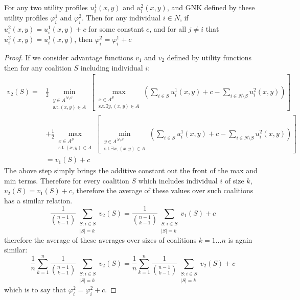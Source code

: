 \begin{theorem}\DIFaddbegin \label{thm:appendix_shift_invariant}
\DIFaddend For any two utility profiles $u^1_i(x,y)$ and $u^2_i(x,y)$, and GNK defined by these utility profiles $\varphi_i^1$ and $\varphi_i^2$.
Then for any individual $i\in N$, if $u_i^2(x,y) = u_i^1(x,y)+c$ for some constant $c$, and for all $j\neq i$ that $u^2_i(x,y) = u^1_i(x,y)$, then $\varphi_i^2 = \varphi_i^1+c$ 
\end{theorem}
\begin{proof}
If we consider advantage functions $v_1$ and $v_2$ defined by utility functions \DIFdelbegin {}\DIFdelend \DIFaddbegin {}\DIFaddend then for any coalition $S$ including individual $i$:
\begin{align}
v_2(S) = &
\frac{1}{2}\min_{\substack{y\in A^{N\setminus S} \\ \text{s.t.}(x,y)\in A}} \left[
\max_{\substack{x\in A^S \\ \text{s.t.}\exists y,(x,y)\in A}}
	\left(\sum_{i\in S} u^1_i(x,y)+c - \sum_{i\in N\setminus S}u_i^2(x,y)\right)\right]\nonumber\\
& +
\frac{1}{2}\max_{\substack{x\in A^S \\ \text{s.t.}(x,y)\in A}} \left[
\min_{\substack{y\in A^{N\setminus S} \\ \text{s.t.}\exists x,(x,y)\in A}}
	\left(\sum_{i\in S} u^1_i(x,y)+c - \sum_{i\in N\setminus S} u_i^2(x,y) \right) \right]\nonumber\\
&= v_1(S)+c\nonumber
\end{align}
The above step simply brings the additive constant out the front of the max and min terms.
Therefore for every coalition $S$ which includes individual $i$ of size $k$, $v_2(S)=v_1(S)+c$, therefore the average of these values over such coalitions has a similar relation.
$$\frac{1}{\binom{n-1}{k-1}} \sum_{\substack{S:i\in S \\ |S|=k}}v_2(S) = \frac{1}{\binom{n-1}{k-1}} \sum_{\substack{S:i\in S \\ |S|=k}}v_1(S) + c$$
therefore the average of these averages over sizes of coalitions $k=1\dots n$ is again similar:
$$\frac{1}{n}\sum_{k=1}^n \frac{1}{\binom{n-1}{k-1}} \sum_{\substack{S:i\in S \\ |S|=k}}v_2(S) = \frac{1}{n}\sum_{k=1}^n \frac{1}{\binom{n-1}{k-1}} \sum_{\substack{S:i\in S \\ |S|=k}}v_2(S) + c$$
which is to say that $\varphi_i^2 = \varphi_i^2+c$.
\end{proof}

